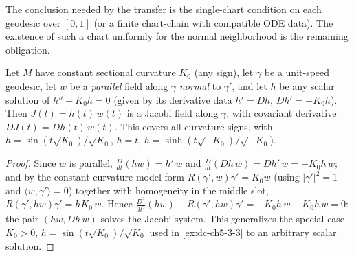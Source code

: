 \begin{lemma}
  \label{lem:dc-ch8-2-1-single-chart}
  \notready
  The conclusion needed by the transfer is the single-chart condition on each geodesic over
  $[0,1]$ (or a finite chart-chain with compatible ODE data). The existence of such a chart
  uniformly for the normal neighborhood is the remaining obligation.
\end{lemma}

\begin{lemma}
  \label{lem:dc-ch8-2-1-jacobi-const-solution}
  \leanok
  Let $M$ have constant sectional curvature $K_0$ (any sign), let $\gamma$ be a
  unit-speed geodesic, let $w$ be a \emph{parallel} field along $\gamma$ \emph{normal}
  to $\gamma'$, and let $h$ be any scalar solution of $h''+K_0 h=0$ (given by its
  derivative data $h'=Dh$, $Dh'=-K_0 h$). Then $J(t)=h(t)\,w(t)$ is a Jacobi field
  along $\gamma$, with covariant derivative $DJ(t)=Dh(t)\,w(t)$. This covers
  all curvature signs, with
  $h=\sin(t\sqrt{K_0})/\sqrt{K_0}$, $h=t$, $h=\sinh(t\sqrt{-K_0})/\sqrt{-K_0}$).
\end{lemma}
\begin{proof}
  \leanok
\sketch
  Since $w$ is parallel, $\tfrac{D}{dt}(h w)=h'\,w$ and
  $\tfrac{D}{dt}(Dh\,w)=Dh'\,w=-K_0 h\,w$; and by the constant-curvature model form
  $R(\gamma',w)\gamma'=K_0 w$ (using $|\gamma'|^2=1$ and
  $\langle w,\gamma'\rangle=0$) together with homogeneity in the middle slot,
  $R(\gamma',h w)\gamma'=h K_0\,w$. Hence
  $\tfrac{D^2}{dt^2}(h w)+R(\gamma',h w)\gamma'=-K_0 h\,w+K_0 h\,w=0$: the pair
  $(h w, Dh\,w)$ solves the Jacobi system. This generalizes the special case
  $K_0>0$, $h=\sin(t\sqrt{K_0})/\sqrt{K_0}$ used in
  \cref{ex:dc-ch5-3-3} to an arbitrary scalar solution.
\end{proof}

